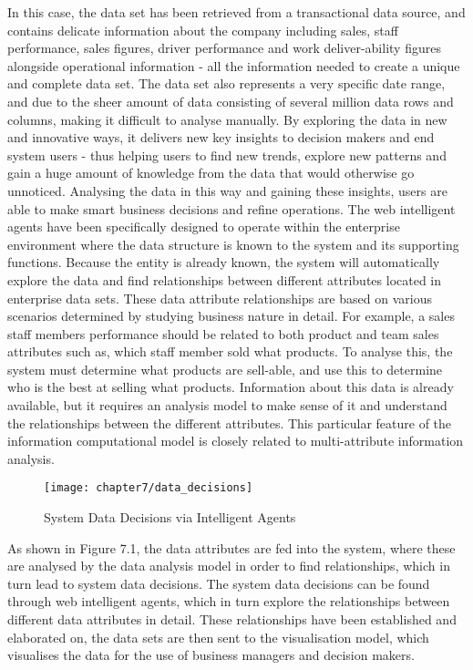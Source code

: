 In this case, the data set has been retrieved from a transactional data source, and contains delicate information about the company including sales, staff performance, sales figures, driver performance and work deliver-ability figures alongside operational information - all the information needed to create a unique and complete data set. The data set also represents a very specific date range, and due to the sheer amount of data consisting of several million data rows and columns, making it difficult to analyse manually. By exploring the data in new and innovative ways, it delivers new key insights to decision makers and end system users - thus helping users to find new trends, explore new patterns and gain a huge amount of knowledge from the data that would otherwise go unnoticed. Analysing the data in this way and gaining these insights, users are able to make smart business decisions and refine operations. The web intelligent agents have been specifically designed to operate within the enterprise environment where the data structure is known to the system and its supporting functions. Because the entity is already known, the system will automatically explore the data and find relationships between different attributes located in enterprise data sets. These data attribute relationships are based on various scenarios determined by studying business nature in detail. For example, a sales staff members performance should be related to both product and team sales attributes such as, which staff member sold what products. To analyse this, the system must determine what products are sell-able, and use this to determine who is the best at selling what products. Information about this data is already available, but it requires an analysis model to make sense of it and understand the relationships between the different attributes. This particular feature of the information computational model is closely related to multi-attribute information analysis.

\begin{figure}[H]
\centering
\texttt{[image: chapter7/data\_decisions]}
\caption{System Data Decisions via Intelligent Agents }
\end{figure}


As shown in Figure 7.1, the data attributes are fed into the system, where these are analysed by the data analysis model in order to find relationships, which in turn lead to system data decisions. The system data decisions can be found through web intelligent agents, which in turn explore the relationships between different data attributes in detail. These relationships have been established and elaborated on, the data sets are then sent to the visualisation model, which visualises the data for the use of business managers and decision makers.

